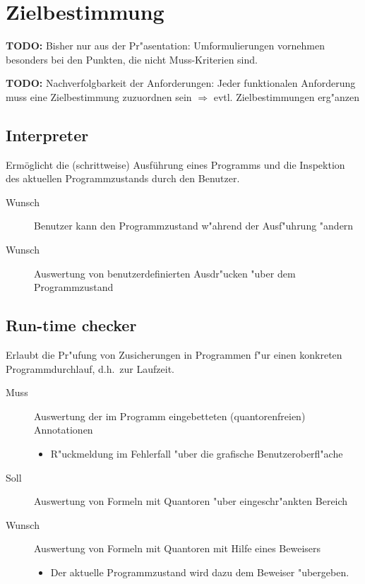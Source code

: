 \section{Zielbestimmung}%

\textbf{TODO:} Bisher nur aus der Pr"asentation: Umformulierungen vornehmen besonders bei den Punkten, die nicht Muss-Kriterien sind.%

\textbf{TODO:} Nachverfolgbarkeit der Anforderungen: Jeder funktionalen Anforderung muss eine Zielbestimmung zuzuordnen sein $\Rightarrow$ evtl. Zielbestimmungen erg"anzen%

\subsection{\see Interpreter}%

Ermöglicht die (schrittweise) Ausführung eines \see Programms und die Inspektion des aktuellen \see Programmzustands durch den Benutzer.%

\begin{description}%
    \item[Wunsch] Benutzer kann den Programmzustand w"ahrend der Ausf"uhrung "andern%
    \item[Wunsch] Auswertung von benutzerdefinierten \see Ausdr"ucken "uber dem Programmzustand%
\end{description}%

\subsection{\see Run-time checker}%

Erlaubt die Pr"ufung von \see Zusicherungen in Programmen f"ur einen konkreten Programmdurchlauf, d.h.\ zur Laufzeit.%

\begin{description}%
    \item [Muss] Auswertung der im Programm eingebetteten (quantorenfreien) \see Annotationen%
        \begin{itemize}%
            \item R"uckmeldung im Fehlerfall "uber die grafische Benutzeroberfl"ache%
        \end{itemize}%
    \item [Soll] Auswertung von Formeln mit \see Quantoren "uber eingeschr"ankten Bereich%
    \item [Wunsch] Auswertung von Formeln mit Quantoren mit Hilfe eines \see Beweisers%
        \begin{itemize}%
            \item Der aktuelle Programmzustand wird dazu dem Beweiser "ubergeben.%
        \end{itemize}%
\end{description}%


